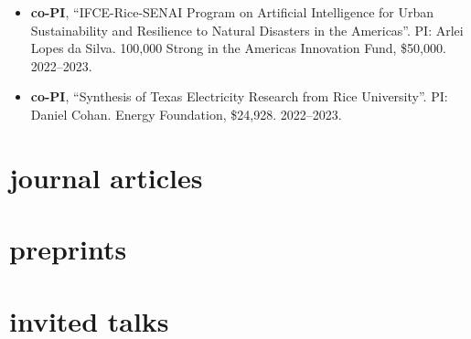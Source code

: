 \documentclass[10pt,oneside]{article}
\begin{document}
\begin{itemize}[label={}]
  \item \textbf{co-PI}, \enquote{IFCE-Rice-SENAI Program on Artificial Intelligence for Urban Sustainability and Resilience to Natural Disasters in the Americas}.  PI: Arlei Lopes da Silva. 100,000 Strong in the Americas Innovation Fund, \$50,000. 2022--2023.
        
  \item \textbf{co-PI}, \enquote{Synthesis of Texas Electricity Research from Rice University}.  PI: Daniel Cohan. Energy Foundation, \$24,928. 2022--2023.
        
\end{itemize}


\section{journal articles}

\mbox{}\vspace{-\dimexpr\baselineskip\relax}
\vspace*{-1em}

\printbibliography[type=article, heading=none]

\section{preprints}

\mbox{}\vspace{-\dimexpr\baselineskip\relax}
\vspace*{-1em}
\printbibliography[filter=ispreprint, heading=none]


\section{invited talks}

\mbox{}\vspace{-\dimexpr\baselineskip\relax}
\end{document}
